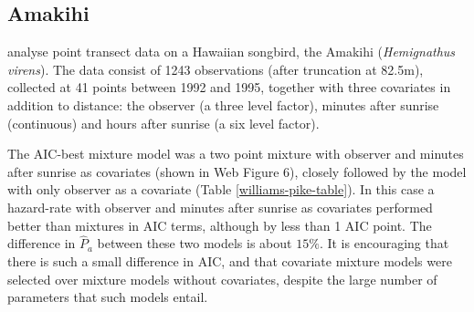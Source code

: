 \documentclass[authoryear,preprint,review,12pt]{elsarticle}
\begin{document}
\subsection{Amakihi}
\label{s:amakihi}

\cite{Marques:2007vm} analyse point transect data on a Hawaiian songbird, the Amakihi (\textit{Hemignathus virens}). The data consist of 1243 observations (after truncation at 82.5m), collected at 41 points between 1992 and 1995, together with three covariates in addition to distance: the observer (a three level factor), minutes after sunrise (continuous) and hours after sunrise (a six level factor).

The AIC-best mixture model was a two point mixture with observer and minutes after sunrise as covariates (shown in Web Figure 6), closely followed by the model with only observer as a covariate (Table \ref{williams-pike-table}). In this case a hazard-rate with observer and minutes after sunrise as covariates performed better than mixtures in AIC terms, although by less than 1 AIC point. The difference in $\hat{P}_a$ between these two models is about $15\%$.  It is encouraging that there is such a small difference in AIC, and that covariate mixture models were selected over mixture models without covariates, despite the large number of parameters that such models entail.
\end{document}

